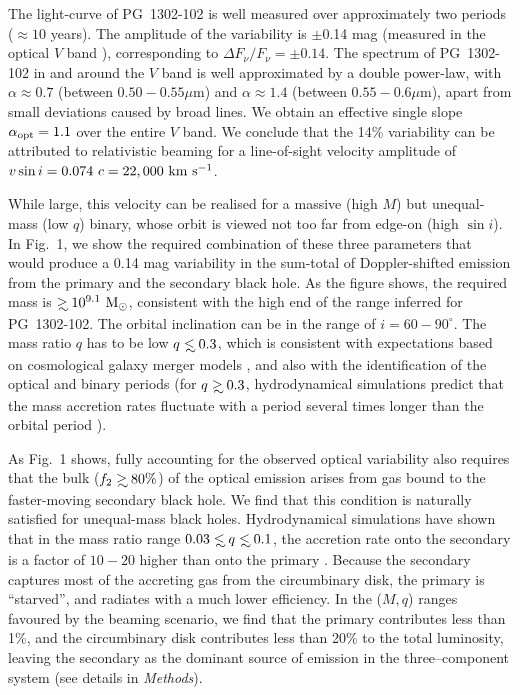 The light-curve of PG~1302-102 is well measured over approximately two
periods ($\approx 10$ years).  The amplitude of the variability is
$\pm$0.14 mag (measured in the optical $V$
band \cite{CRTS2:Djorgovski:2010}), corresponding to $\Delta
F_\nu/F_\nu=\pm0.14$.  The spectrum of PG~1302-102 in and around the
$V$ band is well approximated by a double power-law, with
$\alpha\approx 0.7$ (between $0.50-0.55\mu$m) and $\alpha\approx 1.4$
(between $0.55-0.6\mu$m), apart from small deviations caused by broad
lines.  We obtain an effective single slope $\alpha_{\rm opt}=1.1$
over the entire $V$ band.  We conclude that the 14\% variability can
be attributed to relativistic beaming for a line-of-sight velocity
amplitude of $v\sin i=0.074~c=22,000~{\rm km~s^{-1}}$.

While large, this velocity can be realised for a massive (high $M$)
but unequal-mass (low $q$) binary, whose orbit is viewed not too far
from edge-on (high $\sin i$).  In Fig.~1, we show the required
combination of these three parameters that would produce a 0.14 mag
variability in the sum-total of Doppler-shifted emission from the
primary and the secondary black hole.  As the figure shows, the
required mass is $\gsim 10^{9.1}~{\rm M_\odot}$, consistent with the
high end of the range inferred for PG~1302-102.  The orbital
inclination can be in the range of $i=60-90^\circ$.  The mass ratio
$q$ has to be low $q\lsim 0.3$, which is consistent with expectations
based on cosmological galaxy merger models \cite{Volonteri+2003}, and
also with the identification of the optical and binary periods (for
$q\gsim 0.3$, hydrodynamical simulations predict that the mass
accretion rates fluctuate with a period several times longer than the
orbital period \cite{PG1302MNRAS:2015a}).

As Fig.~1 shows, fully accounting for the observed optical variability
also requires that the bulk ($f_2\gsim 80\%$) of the optical emission
arises from gas bound to the faster-moving secondary black hole. We
find that this condition is naturally satisfied for unequal-mass black
holes. Hydrodynamical simulations have shown that in the mass ratio
range $0.03\lsim q\lsim 0.1$, the accretion rate onto the secondary is
a factor of $10-20$ higher than onto the primary \cite{Farris:2014}.
Because the secondary captures most of the accreting gas from the
circumbinary disk, the primary is ``starved'', and radiates with a
much lower efficiency.  In the ($M,q$) ranges favoured by the beaming
scenario, we find that the primary contributes less than 1\%, and the
circumbinary disk contributes less than 20\% to the total luminosity,
leaving the secondary as the dominant source of emission in the
three--component system (see details in {\it Methods}).

